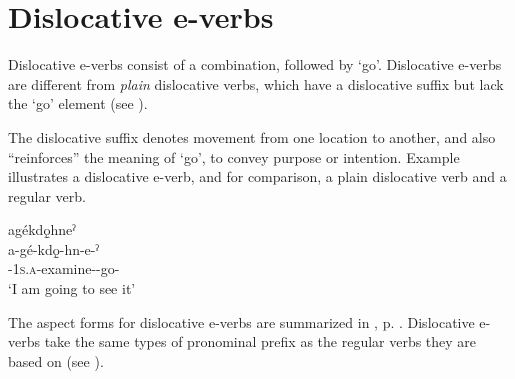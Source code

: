 \section{Dislocative e-verbs} \label{ch:Dislocative-[e] verbs}
Dislocative e-verbs consist of a  combination, followed by  ‘go’. Dislocative e-verbs are different from \emph{plain} dislocative verbs, which have a dislocative suffix but lack the  ‘go’ element (see ).

The dislocative suffix denotes movement from one location to another, and also “reinforces” the meaning of  ‘go’, to convey purpose or intention.  Example  illustrates a dislocative e-verb, and for comparison, a plain dislocative verb and a regular verb.

\ea\label{ex:displurpsufex}
agékdǫ̱hneˀ\\
\gll a-gé-kdǫ̱-hn-e-ˀ\\
 {\factual}-\textsc{1s.a}-examine-{\dislocative}-go-{\stative}\\
\glt `I am going to see it'
\z



The aspect forms for dislocative e-verbs are summarized in , p. \pageref{figtab:1:dislpurp}. Dislocative e-verbs take the same types of pronominal prefix as the regular verbs they are based on (see ).

